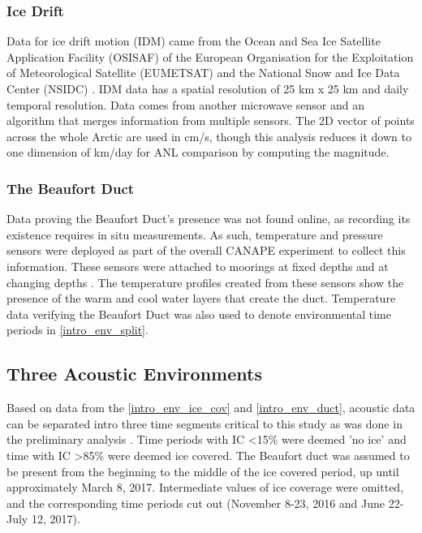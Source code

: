 \subsubsection{Ice Drift} \label{intro_env_ice_dri}

Data for ice drift motion (IDM) came from the Ocean and Sea Ice Satellite Application Facility (OSISAF) \parencite{osisaf_data} of the European Organisation for the Exploitation of Meteorological Satellite (EUMETSAT) \parencite{osisaf_man} and the National Snow and Ice Data Center (NSIDC) \parencite{Tschudi2019polar}. IDM data has a spatial resolution of 25 km x 25 km and daily temporal resolution. Data comes from another microwave sensor and an algorithm that merges information from multiple sensors. The 2D vector of points across the whole Arctic are used in cm/s, though this analysis reduces it down to one dimension of km/day for ANL comparison by computing the magnitude.


\subsubsection{The Beaufort Duct} \label{intro_env_duct}
Data proving the Beaufort Duct's presence was not found online, as recording its existence requires in situ measurements. As such, temperature and pressure sensors were deployed as part of the overall CANAPE experiment to collect this information. These sensors were attached to moorings at fixed depths and at changing depths \parencite{ballard2020temporal}. The temperature profiles created from these sensors show the presence of the warm and cool water layers that create the duct. Temperature data verifying the Beaufort Duct was also used to denote environmental time periods in \autoref{intro_env_split}.

\subsection{Three Acoustic Environments} \label{intro_env_split}

Based on data from the \autoref{intro_env_ice_cov} and \autoref{intro_env_duct}, acoustic data can be separated intro three time segments critical to this study as was done in the preliminary analysis \parencite{Bonnel2021}. Time periods with IC <15\% were deemed 'no ice' and time with IC >85\% were deemed ice covered. The Beaufort duct was assumed to be present from the beginning to the middle of the ice covered period, up until approximately March 8, 2017. \parencite{ballard2020temporal} Intermediate values of ice coverage were omitted, and the corresponding time periods cut out (November 8-23, 2016 and June 22- July 12, 2017).

